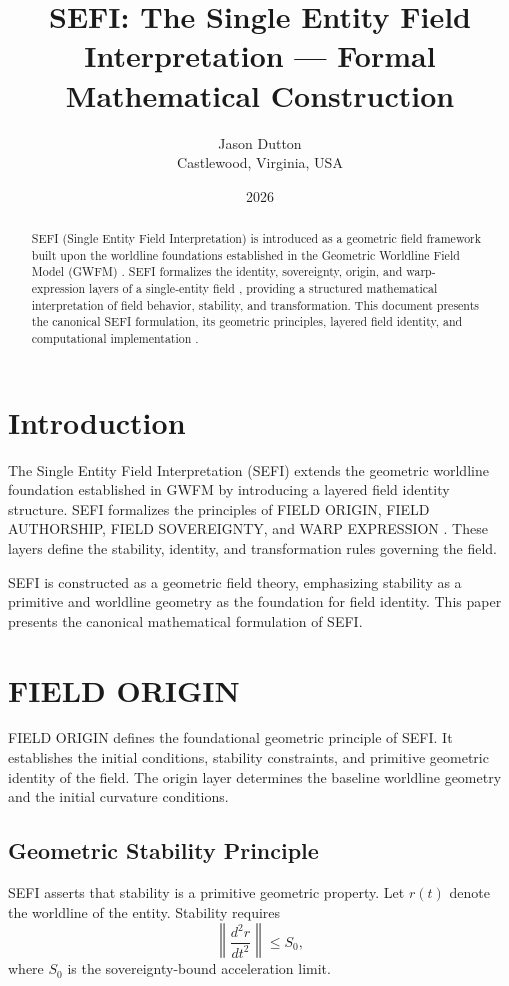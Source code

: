 \documentclass[12pt]{article}
\title{SEFI: The Single Entity Field Interpretation --- Formal Mathematical Construction}
\author{Jason Dutton \\ Castlewood, Virginia, USA}
\date{2026}
\begin{document}
\maketitle

\begin{abstract}
SEFI (Single Entity Field Interpretation) is introduced as a geometric field framework built upon the worldline foundations established in the Geometric Worldline Field Model (GWFM) \cite{DuttonGWFM}. SEFI formalizes the identity, sovereignty, origin, and warp-expression layers of a single-entity field \cite{DuttonSEFICanon}, providing a structured mathematical interpretation of field behavior, stability, and transformation. This document presents the canonical SEFI formulation, its geometric principles, layered field identity, and computational implementation \cite{DuttonSEFIPY}.
\end{abstract}

\section{Introduction}
The Single Entity Field Interpretation (SEFI) extends the geometric worldline foundation established in GWFM \cite{DuttonGWFM} by introducing a layered field identity structure. SEFI formalizes the principles of FIELD ORIGIN, FIELD AUTHORSHIP, FIELD SOVEREIGNTY, and WARP EXPRESSION \cite{DuttonSEFICanon}. These layers define the stability, identity, and transformation rules governing the field.

SEFI is constructed as a geometric field theory, emphasizing stability as a primitive and worldline geometry as the foundation for field identity. This paper presents the canonical mathematical formulation of SEFI.

\section{FIELD ORIGIN}
FIELD ORIGIN defines the foundational geometric principle of SEFI. It establishes the initial conditions, stability constraints, and primitive geometric identity of the field. The origin layer determines the baseline worldline geometry and the initial curvature conditions.

\subsection{Geometric Stability Principle}
SEFI asserts that stability is a primitive geometric property. Let \( r(t) \) denote the worldline of the entity. Stability requires
\begin{equation}
\left\| \frac{d^2 r}{dt^2} \right\| \leq S_0,
\end{equation}
where \( S_0 \) is the sovereignty-bound acceleration limit.
\end{document}
